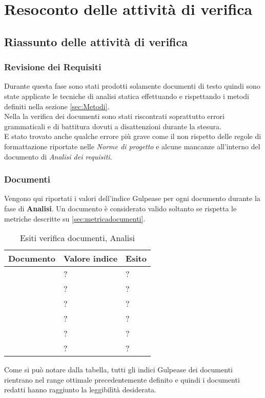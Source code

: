\section{Resoconto delle attività di verifica}
\subsection{Riassunto delle attività di verifica}
\subsubsection{Revisione dei Requisiti}

Durante questa fase sono stati prodotti solamente documenti di testo quindi sono
state applicate le tecniche di analisi statica effettuando  e rispettando i metodi definiti nella sezione \ref{sec:Metodi}.\\
Nella la verifica dei documenti sono stati riscontrati soprattutto errori grammaticali e di battitura dovuti a disattenzioni durante la stesura.\\
E stato trovato anche qualche errore più grave come il non rispetto delle regole di formattazione riportate nelle \textit{Norme di progetto} e alcune mancanze all'interno del documento di \textit{Analisi dei requisiti}.\\

\subsubsection{Documenti}

Vengono qui riportati i valori dell’indice Gulpease per ogni documento durante la fase di \textbf{Analisi}. Un documento è considerato valido soltanto se rispetta le metriche descritte su \ref{sec:metricadocumenti}.

\begin{table}[H]
	\centering
	\begin{tabular}{p{}p{}
			p{}}
		\toprule Documento & Valore indice & Esito \\
		\midrule
		\PianoDiProgetto & ? & ? \\
		\AnalisiDeiRequisiti & ? & ? \\
		\NormeDiProgetto & ? & ? \\
		\PianoDiQualifica & ? & ? \\
		\StudioDiFattibilita & ? & ? \\
		\Glossario & ? & ? \\
		\bottomrule
	\end{tabular}
	\label{tab:costorequisiti}
	\caption{Esiti verifica documenti, Analisi}
\end{table}

Come si può notare dalla tabella, tutti gli indici Gulpease dei documenti rientrano nel range ottimale precedentemente definito e quindi i documenti redatti hanno raggiunto la leggibilità desiderata.
